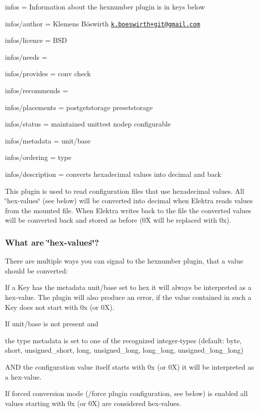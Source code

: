 
\begin{DoxyItemize}
\item infos = Information about the hexnumber plugin is in keys below
\item infos/author = Klemens Böswirth \href{mailto:k.boeswirth+git@gmail.com}{\tt k.\+boeswirth+git@gmail.\+com}
\item infos/licence = B\+SD
\item infos/needs =
\item infos/provides = conv check
\item infos/recommends =
\item infos/placements = postgetstorage presetstorage
\item infos/status = maintained unittest nodep configurable
\item infos/metadata = unit/base
\item infos/ordering = type
\item infos/description = converts hexadecimal values into decimal and back
\end{DoxyItemize}

This plugin is used to read configuration files that use hexadecimal values. All \char`\"{}hex-\/values\char`\"{} (see below) will be converted into decimal when Elektra reads values from the mounted file. When Elektra writes back to the file the converted values will be converted back and stored as before ({\ttfamily 0X} will be replaced with {\ttfamily 0x}).

\subsubsection*{What are \char`\"{}hex-\/values\char`\"{}?}

There are multiple ways you can signal to the hexnumber plugin, that a value should be converted\+:


\begin{DoxyEnumerate}
\item If a Key has the metadata {\ttfamily unit/base} set to {\ttfamily hex} it will always be interpreted as a hex-\/value. The plugin will also produce an error, if the value contained in such a Key does not start with {\ttfamily 0x} (or {\ttfamily 0X}).
\item If {\ttfamily unit/base} is not present and
\begin{DoxyItemize}
\item the {\ttfamily type} metadata is set to one of the recognized integer-\/types (default\+: {\ttfamily byte}, {\ttfamily short}, {\ttfamily unsigned\+\_\+short}, {\ttfamily long}, {\ttfamily unsigned\+\_\+long}, {\ttfamily long\+\_\+long}, {\ttfamily unsigned\+\_\+long\+\_\+long})
\item A\+ND the configuration value itself starts with {\ttfamily 0x} (or {\ttfamily 0X}) it will be interpreted as a hex-\/value.
\end{DoxyItemize}
\item If forced conversion mode ({\ttfamily /force} plugin configuration, see below) is enabled all values starting with {\ttfamily 0x} (or {\ttfamily 0X}) are considered hex-\/values.
\end{DoxyEnumerate}

